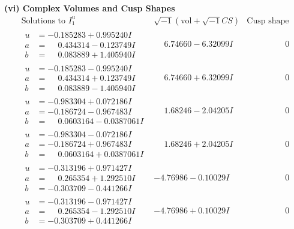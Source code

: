 \documentclass[1p]{elsarticle_modified}
\theoremstyle{definition}
\newcommand{\I}{\sqrt{-1}}
\begin{document}
\newpage\flushleft \textbf{(vi) Complex Volumes and Cusp Shapes}
$$\begin{array}{c|c|c}  
\text{Solutions to }I^u_{1}& \I (\text{vol} + \sqrt{-1}CS) & \text{Cusp shape}\\
 \hline 
\begin{aligned}
u &= -0.185283 + 0.995240 I \\
a &= \phantom{-}0.434314 - 0.123749 I \\
b &= \phantom{-}0.083889 + 1.405940 I\end{aligned}
 & \phantom{-}6.74660 - 6.32099 I & \phantom{-0.000000 } 0 \\ \hline\begin{aligned}
u &= -0.185283 - 0.995240 I \\
a &= \phantom{-}0.434314 + 0.123749 I \\
b &= \phantom{-}0.083889 - 1.405940 I\end{aligned}
 & \phantom{-}6.74660 + 6.32099 I & \phantom{-0.000000 } 0 \\ \hline\begin{aligned}
u &= -0.983304 + 0.072186 I \\
a &= -0.186724 - 0.967483 I \\
b &= \phantom{-}0.0603164 - 0.0387061 I\end{aligned}
 & \phantom{-}1.68246 - 2.04205 I & \phantom{-0.000000 } 0 \\ \hline\begin{aligned}
u &= -0.983304 - 0.072186 I \\
a &= -0.186724 + 0.967483 I \\
b &= \phantom{-}0.0603164 + 0.0387061 I\end{aligned}
 & \phantom{-}1.68246 + 2.04205 I & \phantom{-0.000000 } 0 \\ \hline\begin{aligned}
u &= -0.313196 + 0.971427 I \\
a &= \phantom{-}0.265354 + 1.292510 I \\
b &= -0.303709 - 0.441266 I\end{aligned}
 & -4.76986 - 0.10029 I & \phantom{-0.000000 } 0 \\ \hline\begin{aligned}
u &= -0.313196 - 0.971427 I \\
a &= \phantom{-}0.265354 - 1.292510 I \\
b &= -0.303709 + 0.441266 I\end{aligned}
 & -4.76986 + 0.10029 I & \phantom{-0.000000 } 0 \\ \hline\begin{aligned}

\end{aligned}
\end{array}$$
\end{document}
